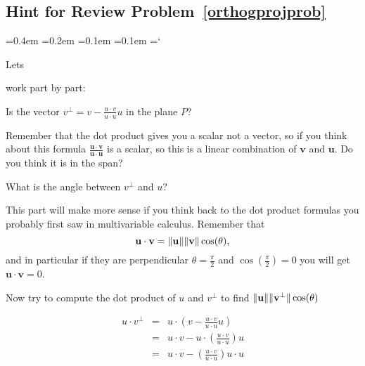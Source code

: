
\subsection*{Hint  for Review Problem~\ref{orthogprojprob}}

{\ttfamily
{}\font=0.4em
\font=0.2em
\font=0.1em
\font=0.1em
\hyphenchar\font=`\-


\hypertarget{scripts_orthonormal_bases_hint3}{Lets} 
work part by part:
\begin{enumext}[label=\alph*,wrap-label=(#1)]
\item Is the vector $v^\bot = v-\frac{u\cdot v}{u\cdot u}u$ in the plane $P$? 

Remember that the dot product gives you a scalar not a vector, so if you think about this formula $\frac{\mathbf{u}\cdot \mathbf{v}}{\mathbf{u}\cdot \mathbf{u}}$ is a scalar, so this is a linear combination of $\mathbf{v}$ and $\mathbf{u}$. Do you think it is in the span?

\item What is the angle between $v^\bot$ and $u$?

This part will make more sense if you think back to the dot product formulas you probably first saw in multivariable calculus. Remember that 
\[\mathbf{u}\cdot \mathbf{v} = \|\mathbf{u}\| \|\mathbf{v}\| \cos(\theta),
\] 
and in particular if they are perpendicular $\theta = \frac{\pi}{2}$ and $\cos(\frac{\pi}{2}) = 0$ you will get $\mathbf{u}\cdot \mathbf{v} = 0$.

Now try to compute the dot product of $u$ and $v^\bot$ to find $ \|\mathbf{u}\| \|\mathbf{v^\bot}\| \cos(\theta)$

\begin{eqnarray*}
u\cdot v^\bot &=& u\cdot \left( v  -  \frac{u\cdot v}{u\cdot u}u \right) \\
&=& u\cdot  v  - u\cdot \left( \frac{u\cdot v}{u\cdot u} \right)u \\
&=& u\cdot  v  - \left( \frac{u\cdot v}{u\cdot u} \right) u\cdot u \\
\end{eqnarray*}


\end{enumext}}
